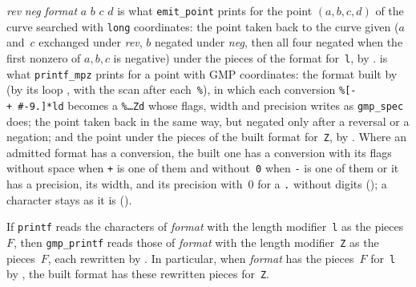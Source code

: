 \begin{definition}\label{def:Printf.emitPoint}
  \leanok
   \textit{rev} \textit{neg} \textit{format} $a$ $b$ $c$ $d$ is what
  \texttt{emit\_point} prints for the point $(a, b, c, d)$ of the curve searched with \texttt{long}
  coordinates: the point taken back to the curve given ($a$ and~$c$ exchanged under \textit{rev},
  $b$ negated under \textit{neg}, then all four negated when the first nonzero of $a, b, c$ is
  negative) under the pieces of the format for~\texttt{l}, by .
   is what \texttt{printf\_mpz} prints for a point with GMP
  coordinates: the format built by  (by its loop
  , with the scan 
  after each~\texttt{\%}), in which each conversion \texttt{\%[-+~\#-9.]*ld}
  becomes a \texttt{\%\dots Zd} whose flags, width and precision 
  writes as \texttt{gmp\_spec} does; the point taken back in the same way, but negated only after a
  reversal or a negation; and the point under the pieces of the built format for~\texttt{Z}, by
  . Where an admitted format has a conversion, the built one has a
  conversion with its flags without space when \texttt{+} is one of them and without~\texttt{0} when
  \texttt{-} is one of them or it has a precision, its width, and its precision with~$0$ for a
  \texttt{.} without digits (); a character stays as it is
  ().
\end{definition}


\begin{lemma}\label{lem:Printf.rewriteFormat_spec}
  \leanok
  If \texttt{printf} reads the characters of \textit{format} with the length modifier~\texttt{l}
  as the pieces~$F$, then \texttt{gmp\_printf} reads those of 
  \textit{format} with the length modifier~\texttt{Z} as the pieces~$F$, each rewritten by
  . In particular, when \textit{format} has the pieces~$F$
  for~\texttt{l} by , the built format has these rewritten pieces
  for~\texttt{Z}.
\end{lemma}


